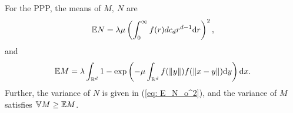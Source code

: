     \begin{theorem}
    \label{thm: N,M}
For the PPP, the means of $M,~N$ are
\begin{equation}
  \mathbb{E} N = \lambda\mu \left(\int_{0}^{\infty}f(r)dc_d r^{d-1} \mathrm{d} r\right)^2,        \label{eq: EN}
\end{equation}
and
 \begin{equation}
     \mathbb{E} M = \lambda\int_{\mathbb{R}^d}  1-\exp\left(-\mu\int_{\mathbb{R}^d}f(\|y\|)f(\|x-y\|)\mathrm{d} y\right)\mathrm{d} x.\label{eq: EM}
 \end{equation}
 Further, the variance of $N$ is given in (\ref{eq: E_N_o^2}),
 and the variance of $M$ satisfies $\mathbb{V} M \geq \mathbb{E} M$.
\end{theorem}
